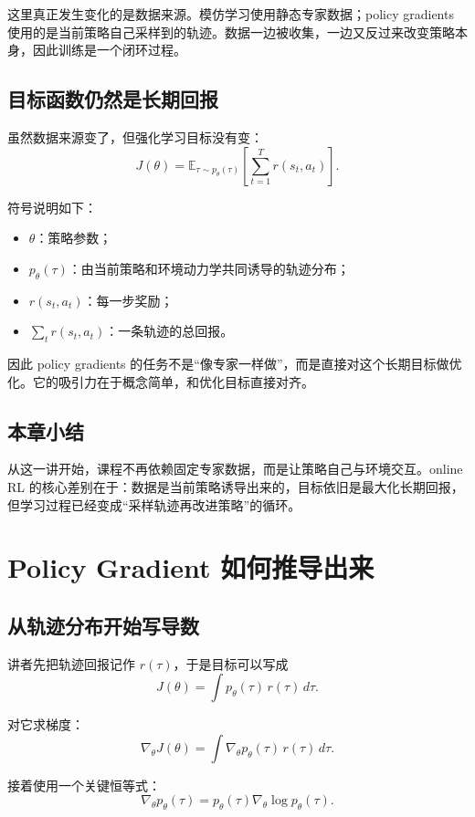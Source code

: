\documentclass[a4paper]{article}
\begin{document}
这里真正发生变化的是数据来源。模仿学习使用静态专家数据；policy gradients 使用的是当前策略自己采样到的轨迹。数据一边被收集，一边又反过来改变策略本身，因此训练是一个闭环过程。

\subsection{目标函数仍然是长期回报}

虽然数据来源变了，但强化学习目标没有变：
\[
J(\theta)=\mathbb{E}_{\tau\sim p_\theta(\tau)}\left[\sum_{t=1}^{T} r(s_t,a_t)\right].
\]

符号说明如下：
\begin{itemize}
\item \(\theta\)：策略参数；
\item \(p_\theta(\tau)\)：由当前策略和环境动力学共同诱导的轨迹分布；
\item \(r(s_t,a_t)\)：每一步奖励；
\item \(\sum_t r(s_t,a_t)\)：一条轨迹的总回报。
\end{itemize}

因此 policy gradients 的任务不是“像专家一样做”，而是直接对这个长期目标做优化。它的吸引力在于概念简单，和优化目标直接对齐。

\subsection{本章小结}

从这一讲开始，课程不再依赖固定专家数据，而是让策略自己与环境交互。online RL 的核心差别在于：数据是当前策略诱导出来的，目标依旧是最大化长期回报，但学习过程已经变成“采样轨迹再改进策略”的循环。

\section{Policy Gradient 如何推导出来}

\subsection{从轨迹分布开始写导数}

讲者先把轨迹回报记作 \(r(\tau)\)，于是目标可以写成
\[
J(\theta)=\int p_\theta(\tau)\,r(\tau)\,d\tau.
\]

对它求梯度：
\[
\nabla_\theta J(\theta)=\int \nabla_\theta p_\theta(\tau)\,r(\tau)\,d\tau.
\]

接着使用一个关键恒等式：
\[
\nabla_\theta p_\theta(\tau)=p_\theta(\tau)\nabla_\theta \log p_\theta(\tau).
\]
\end{document}
